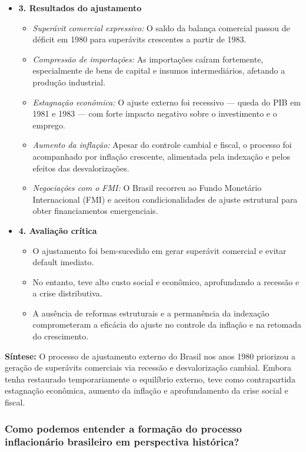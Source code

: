 \documentclass[a4paper,12pt]{article}[abntex2]
\begin{document}
\begin{itemize}
    \item \textbf{3. Resultados do ajustamento}
    \begin{itemize}
        \item \textit{Superávit comercial expressivo:} O saldo da balança comercial passou de déficit em 1980 para superávits crescentes a partir de 1983.
        \item \textit{Compressão de importações:} As importações caíram fortemente, especialmente de bens de capital e insumos intermediários, afetando a produção industrial.
        \item \textit{Estagnação econômica:} O ajuste externo foi recessivo — queda do PIB em 1981 e 1983 — com forte impacto negativo sobre o investimento e o emprego.
        \item \textit{Aumento da inflação:} Apesar do controle cambial e fiscal, o processo foi acompanhado por inflação crescente, alimentada pela indexação e pelos efeitos das desvalorizações.
        \item \textit{Negociações com o FMI:} O Brasil recorreu ao Fundo Monetário Internacional (FMI) e aceitou condicionalidades de ajuste estrutural para obter financiamentos emergenciais.
    \end{itemize}

    \item \textbf{4. Avaliação crítica}
    \begin{itemize}
        \item O ajustamento foi bem-sucedido em gerar superávit comercial e evitar default imediato.
        \item No entanto, teve alto custo social e econômico, aprofundando a recessão e a crise distributiva.
        \item A ausência de reformas estruturais e a permanência da indexação comprometeram a eficácia do ajuste no controle da inflação e na retomada do crescimento.
    \end{itemize}
\end{itemize}

\textbf{Síntese:} O processo de ajustamento externo do Brasil nos anos 1980 priorizou a geração de superávits comerciais via recessão e desvalorização cambial. Embora tenha restaurado temporariamente o equilíbrio externo, teve como contrapartida estagnação econômica, aumento da inflação e aprofundamento da crise social e fiscal.

\subsubsection{\textbf{Como podemos entender a formação do processo inflacionário brasileiro em perspectiva histórica?}}
\end{document}
